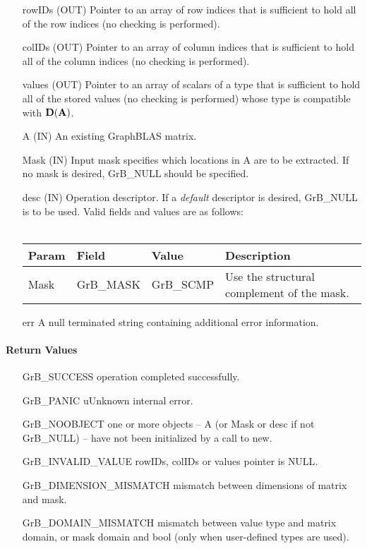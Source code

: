 \begin{itemize}[leftmargin=1.1in]
    \item[{\sf rowIDs}] ({\sf OUT}) Pointer to an array of row indices that is sufficient to
                        hold all of the row indices (no checking is performed).
    \item[{\sf colIDs}] ({\sf OUT}) Pointer to an array of column indices that is sufficient to
                        hold all of the column indices (no checking is performed). 
    \item[{\sf values}] ({\sf OUT}) Pointer to an array of scalars of a type that is sufficient to
                        hold all of the stored values (no checking is performed) whose
                        type is compatible with $\bold{D}({\bf A})$.
    \item[{\sf A}]      ({\sf IN}) An existing GraphBLAS matrix.
    \item[{\sf Mask}]   ({\sf IN}) Input mask specifies which locations in
                        {\sf A} are to be extracted.  If no mask is desired,
                        {\sf GrB\_NULL} should be specified.
    \item[{\sf desc}]   ({\sf IN}) Operation descriptor. If a
    \emph{default} descriptor is desired, {\sf GrB\_NULL} is to be
    used.  Valid fields and values are as follows: \\ ~\\
    \begin{tabular}{lllp{2.5in}}
    Param & Field  & Value & Description \\
    \hline
    {\sf Mask} & {\sf GrB\_MASK} & {\sf GrB\_SCMP}   & Use the structural complement of the mask. \\
    \end{tabular}
    \item[{\sf err}]     A null terminated string containing additional error information.
\end{itemize}

\paragraph{Return Values}

\begin{itemize}[leftmargin=2.1in]
\item[{\sf GrB\_SUCCESS}]     operation completed successfully.
\item[{\sf GrB\_PANIC}]       uUnknown internal error.
\item[{\sf GrB\_NOOBJECT}]    one or more objects -- {\sf A} (or {\sf Mask} or {\sf desc} if not {\sf GrB\_NULL}) -- have not been initialized by a call to {\sf new}.
\item[{\sf GrB\_INVALID\_VALUE}]  {\sf rowIDs}, {\sf colIDs} or {\sf values} pointer is {\sf NULL}.
\item[\sf GrB\_DIMENSION\_MISMATCH]  
                       mismatch between dimensions of matrix and mask. 
\item[\sf GrB\_DOMAIN\_MISMATCH]  
                       mismatch between value type and matrix domain, or mask domain and {\sf bool}  (only when user-defined types are used).
\end{itemize}

